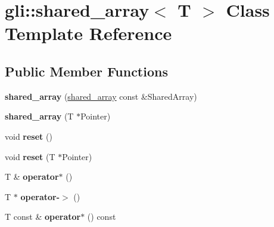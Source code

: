 \hypertarget{classgli_1_1shared__array}{\section{gli\-:\-:shared\-\_\-array$<$ \-T $>$ \-Class \-Template \-Reference}
\label{classgli_1_1shared__array}
}
\subsection*{\-Public \-Member \-Functions}
\begin{DoxyCompactItemize}
\item 
\hypertarget{classgli_1_1shared__array_a783bc1b2def1bf24320f622b8440c189}{{\bfseries shared\-\_\-array} (\hyperlink{classgli_1_1shared__array}{shared\-\_\-array} const \&\-Shared\-Array)}\label{classgli_1_1shared__array_a783bc1b2def1bf24320f622b8440c189}

\item 
\hypertarget{classgli_1_1shared__array_a25ed750ea0276322f2257d3c41ad897e}{{\bfseries shared\-\_\-array} (\-T $\ast$\-Pointer)}\label{classgli_1_1shared__array_a25ed750ea0276322f2257d3c41ad897e}

\item 
\hypertarget{classgli_1_1shared__array_a630434d326e5819e611af0fe64bb96e8}{void {\bfseries reset} ()}\label{classgli_1_1shared__array_a630434d326e5819e611af0fe64bb96e8}

\item 
\hypertarget{classgli_1_1shared__array_a02c1f5e720a13897957664858463e4ac}{void {\bfseries reset} (\-T $\ast$\-Pointer)}\label{classgli_1_1shared__array_a02c1f5e720a13897957664858463e4ac}

\item 
\hypertarget{classgli_1_1shared__array_a777a01c3c20b89778c7e10a10bbf63a5}{\-T \& {\bfseries operator$\ast$} ()}\label{classgli_1_1shared__array_a777a01c3c20b89778c7e10a10bbf63a5}

\item 
\hypertarget{classgli_1_1shared__array_a9cf87f42ddfb7ba5f49fdf064cbf5405}{\-T $\ast$ {\bfseries operator-\/$>$} ()}\label{classgli_1_1shared__array_a9cf87f42ddfb7ba5f49fdf064cbf5405}

\item 
\hypertarget{classgli_1_1shared__array_a34eca64a4847d5f82f71054d7b1c4d6e}{\-T const \& {\bfseries operator$\ast$} () const }\label{classgli_1_1shared__array_a34eca64a4847d5f82f71054d7b1c4d6e}


\end{DoxyCompactItemize}
